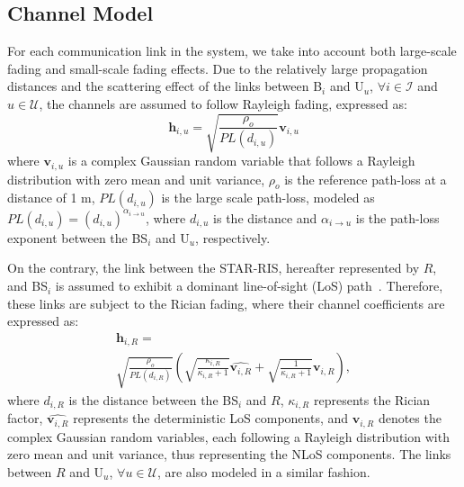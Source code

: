 \documentclass[conference]{IEEEtran}
\begin{document}
\subsection{Channel Model}
For each communication link in the system, we take into account both large-scale fading and small-scale fading effects. Due to the relatively large propagation distances and the scattering effect of the links between B$_i$ and U$_u$, $\forall i \in \mathcal{I}$ and $u \in \mathcal{U}$, the channels are assumed to follow Rayleigh fading, expressed as:
\begin{equation}
    \textbf{h}_{i,u} = \sqrt{\frac{\rho_{o}}{PL(d_{i,u})}} \mathbf{v}_{i,u}
\end{equation}
where $\mathbf{v}_{i,u}$ is a complex Gaussian random variable that follows a Rayleigh distribution with zero mean and unit variance, $\rho_{o}$ is the reference path-loss at a distance of 1 m, $PL(d_{i,u})$ is the large scale path-loss, modeled as $PL(d_{i,u})=\left(d_{i,u}\right)^{\alpha_{i\rightarrow u}}$, where $d_{i, u}$ is the distance and $\alpha_{i\rightarrow u}$ is the path-loss exponent between the BS$_i$ and U$_u$, respectively.

On the contrary, the link between the STAR-RIS, hereafter represented by $R$, and BS$_i$ is assumed to exhibit a dominant line-of-sight (LoS) path~\cite{guo2020intelligent}. Therefore, these links are subject to the Rician fading, where their channel coefficients are expressed as:
\begin{multline}
    \textbf{h}_{i,R} = \\
    \sqrt{\frac{\rho_{o}}{PL(d_{i,R})}} \left( \sqrt{\frac{\kappa_{i,R}}{\kappa_{i,R} + 1}} \hat{\mathbf{v}_{i,R}} + \sqrt{\frac{1}{\kappa_{i,R} + 1}} \mathbf{v}_{i,R} \right),
\end{multline}
where $d_{i,R}$ is the distance between the BS$_i$ and $R$, $\kappa_{i,R}$ represents the Rician factor, $\hat{\mathbf{v}_{i,R}}$ represents the deterministic LoS components, and $\mathbf{v}_{i,R}$ denotes the complex Gaussian random variables, each following a Rayleigh distribution with zero mean and unit variance, thus representing the NLoS components. The links between $R$ and U$_u$, $\forall u \in \mathcal{U}$, are also modeled in a similar fashion.
\end{document}
